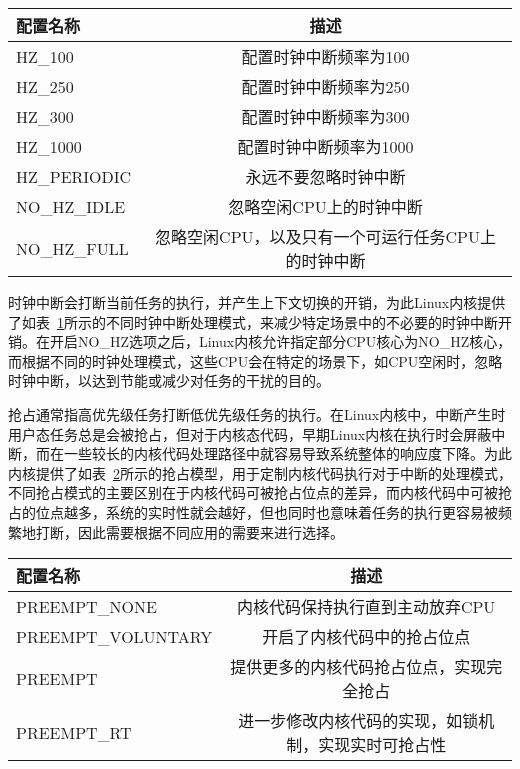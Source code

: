 \begin{table}[H]
    \label{tab:config_hz}
    \footnotesize%
    \setlength{\tabcolsep}{4pt}%
    \renewcommand{\arraystretch}{1.5}%
    \centering
    \begin{tabular}{lc}
        \hline
        配置名称 & 描述 \\
        \hline
        HZ\_100  & 配置时钟中断频率为100  \\
        HZ\_250  & 配置时钟中断频率为250 \\
        HZ\_300  & 配置时钟中断频率为300 \\
        HZ\_1000 & 配置时钟中断频率为1000 \\
        HZ\_PERIODIC & 永远不要忽略时钟中断 \\
        NO\_HZ\_IDLE & 忽略空闲CPU上的时钟中断 \\
        NO\_HZ\_FULL & 忽略空闲CPU，以及只有一个可运行任务CPU上的时钟中断 \\
        \hline
    \end{tabular}
\end{table}

时钟中断会打断当前任务的执行，并产生上下文切换的开销，为此Linux内核提供了如表~\ref{tab:config_hz}所示的不同时钟中断处理模式，来减少特定场景中的不必要的时钟中断开销。在开启NO\_HZ选项之后，Linux内核允许指定部分CPU核心为NO\_HZ核心，而根据不同的时钟处理模式，这些CPU会在特定的场景下，如CPU空闲时，忽略时钟中断，以达到节能或减少对任务的干扰的目的。

抢占通常指高优先级任务打断低优先级任务的执行。在Linux内核中，中断产生时用户态任务总是会被抢占，但对于内核态代码，早期Linux内核在执行时会屏蔽中断，而在一些较长的内核代码处理路径中就容易导致系统整体的响应度下降。为此内核提供了如表~\ref{tab:config_preempt}所示的抢占模型，用于定制内核代码执行对于中断的处理模式，不同抢占模式的主要区别在于内核代码可被抢占位点的差异，而内核代码中可被抢占的位点越多，系统的实时性就会越好，但也同时也意味着任务的执行更容易被频繁地打断，因此需要根据不同应用的需要来进行选择。

\begin{table}
    \label{tab:config_preempt}
    \footnotesize%
    \setlength{\tabcolsep}{4pt}%
    \renewcommand{\arraystretch}{1.5}%
    \centering
    \begin{tabular}{lc}
        \hline
        配置名称 & 描述 \\
        \hline
        PREEMPT\_NONE  & 内核代码保持执行直到主动放弃CPU  \\
        PREEMPT\_VOLUNTARY  & 开启了内核代码中的抢占位点 \\
        PREEMPT  & 提供更多的内核代码抢占位点，实现完全抢占 \\
        PREEMPT\_RT & 进一步修改内核代码的实现，如锁机制，实现实时可抢占性 \\
        \hline
    \end{tabular}
\end{table}

